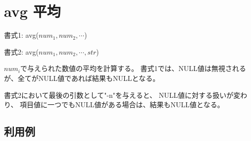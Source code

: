 
%

\section{avg 平均\label{sect:avg}}

書式1: avg($num_1,num_2,\cdots$)

書式2: avg($num_1,num_2,\cdots,str$)

$num_i$で与えられた数値の平均を計算する。
書式1では、NULL値は無視されるが、全てがNULL値であれば結果もNULLとなる。

書式2において最後の引数として"-n"を与えると、
NULL値に対する扱いが変わり、
項目値に一つでもNULL値がある場合は、結果もNULL値となる。

\subsection*{利用例}


%
